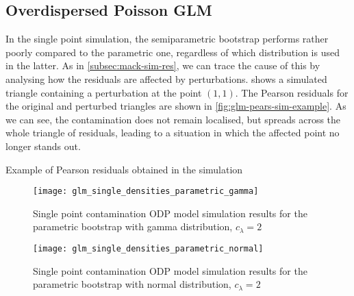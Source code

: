 \documentclass[a4paper]{book}
\begin{document}
\subsection{Overdispersed Poisson GLM}

In the single point simulation, the semiparametric bootstrap performs rather poorly compared to the parametric one, regardless of which distribution is used in the latter. As in \cref{subsec:mack-sim-res}, we can trace the cause of this by analysing how the residuals are affected by perturbations.  shows a simulated triangle containing a perturbation at the point $(1, 1)$. The Pearson residuals for the original and perturbed triangles are shown in \cref{fig:glm-pears-sim-example}. As we can see, the contamination does not remain localised, but spreads across the whole triangle of residuals, leading to a situation in which the affected point no longer stands out.



\begin{table}[!htb]
  \begin{subtable}{\linewidth}
    
  \end{subtable}
  \newline
  \vspace*{0.25cm}
  \newline
  \begin{subtable}{\linewidth}
    
  \end{subtable}
  \caption{Example of Pearson residuals obtained in the simulation}
  \label{fig:glm-pears-sim-example}
\end{table}

\begin{landscape}
  \begin{figure}
    \centering
    \texttt{[image: glm\_single\_densities\_parametric\_gamma]}
    \caption{Single point contamination ODP model simulation results for the parametric bootstrap with gamma distribution, $c_\lambda = 2$}
    \label{fig:odp-single-param-gamma}
  \end{figure}
\end{landscape}

\begin{landscape}
  \begin{figure}
    \centering
    \texttt{[image: glm\_single\_densities\_parametric\_normal]}
    \caption{Single point contamination ODP model simulation results for the parametric bootstrap with normal distribution, $c_\lambda = 2$}
    \label{fig:odp-single-param-norm}
  \end{figure}
\end{landscape}
\end{document}
